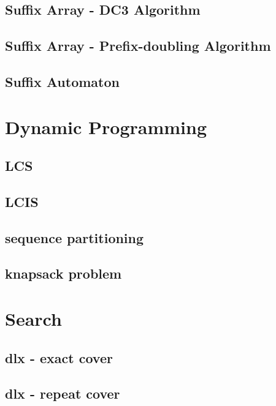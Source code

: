 \documentclass[a4paper,5pt,twocolumn,titlepage]{article}
\begin{document}
\subsection{Suffix Array - DC3 Algorithm}

\subsection{Suffix Array - Prefix-doubling Algorithm}

\subsection{Suffix Automaton}


\section{Dynamic Programming}
\subsection{LCS}

\subsection{LCIS}

\subsection{sequence partitioning}

\subsection{knapsack problem}


\section{Search}
\subsection{dlx - exact cover}

\subsection{dlx - repeat cover}

\end{document}
